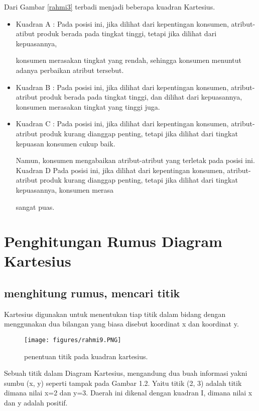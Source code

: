 Dari Gambar \ref{rahmi3} terbadi menjadi beberapa kuadran Kartesius.
\begin{itemize}
\item Kuadran A :
Pada posisi ini, jika dilihat dari kepentingan konsumen, atribut-atibut produk berada pada tingkat tinggi, tetapi jika dilihat dari kepuasannya, 

konsumen merasakan tingkat yang rendah, sehingga konsumen menuntut adanya perbaikan atribut tersebut.
\item Kuadran B :
Pada posisi ini, jika dilihat dari kepentingan konsumen, atribut-atribut produk berada pada tingkat tinggi, dan dilihat dari kepuasannya, 
konsumen merasakan tingkat yang tinggi juga.
\item Kuadran C :
Pada posisi ini, jika dilihat dari kepentingan konsumen, atribut-atribut produk kurang dianggap penting, tetapi jika dilihat dari tingkat kepuasan konsumen cukup baik.

Namun, konsumen mengabaikan atribut-atribut yang terletak pada posisi ini.
Kuadran D
Pada posisi ini, jika dilihat dari kepentingan konsumen, atribut-atribut produk kurang dianggap penting, tetapi jika dilihat dari tingkat kepuasannya, konsumen merasa

sangat puas.
\end{itemize}


\section{Penghitungan Rumus Diagram Kartesius}
\subsection{menghitung rumus, mencari titik}

Kartesius digunakan untuk menentukan tiap titik dalam bidang dengan menggunakan dua bilangan yang biasa disebut koordinat x dan koordinat y.
\begin{figure}[ht]

	\centerline{\texttt{[image: figures/rahmi9.PNG]}}
	\caption{penentuan titik pada kuadran kartesius.}

	\label{rahmi9}
\end{figure}


Sebuah titik dalam Diagram Kartesius, mengandung dua buah informasi yakni sumbu (x, y) seperti tampak pada Gambar 1.2. 
Yaitu titik (2, 3) adalah titik dimana nilai x=2 dan y=3. Daerah ini dikenal dengan kuadran I, dimana nilai x dan y adalah positif.

